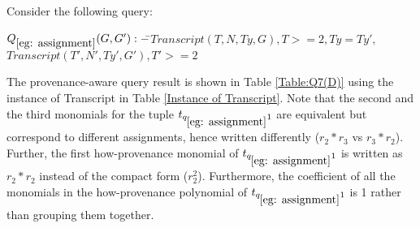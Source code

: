 \begin{example} \label{eg: assignment}
Consider the following query:
\begin{tabbing}
$Q_{\ref{eg: assignment}}(G, G') :- $\=$Transcript(T, N, Ty, G), T >= 2, Ty = Ty',$\\
\>$Transcript(T', N', Ty', G'), T' >= 2$
\end{tabbing}

The provenance-aware query result is shown in Table \ref{Table:Q7(D)} using the instance of Transcript in Table \ref{Instance of Transcript}. Note that the second and the third monomials for the tuple $t_{q_{\ref{eg: assignment}}1}$ are equivalent but correspond to different assignments, hence written differently ($r_2*r_3$ vs $r_3*r_2$).
Further, the first how-provenance monomial of $t_{q_{\ref{eg: assignment}}1}$ is written as $r_2*r_2$ instead of the compact form ($r_2^2$).  Furthermore, the coefficient of all the monomials in the how-provenance polynomial of $t_{q_{\ref{eg: assignment}}1}$ is 1 rather than grouping them together.




\end{example}


